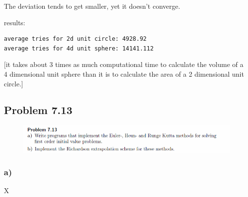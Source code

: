 The deviation tends to get smaller, yet it doesn't converge.

results:

\begin{lstlisting}[caption=Result of 1.1 a), keywordstyle=\color{black}]
average tries for 2d unit circle: 4928.92
average tries for 4d unit sphere: 14141.112
\end{lstlisting}

[it takes about 3 times as much computational time to calculate the volume of a 4 dimensional unit sphere than it is to calculate the area of a 2 dimensional unit circle.]






\subsection{Problem 7.13}


\begin{figure}[!ht]
\includegraphics[width=1\textwidth]{chapters/images/desc-7-13}
\end{figure}



\subsubsection{a)}

X

